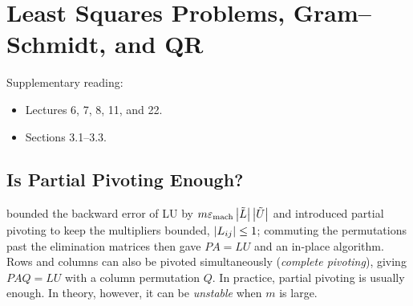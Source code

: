 \chapter{Least Squares Problems, Gram--Schmidt, and QR}
\label{ch:ls}

Supplementary reading:
\begin{itemize}
  \item \cite{TB} Lectures 6, 7, 8, 11, and 22.
  \item \cite{Demmel} Sections 3.1--3.3.
\end{itemize}

\section{Is Partial Pivoting Enough?}

 bounded the backward error of LU by $m\varepsilon_{\mathrm{mach}}\left\lvert \tilde{L} \right\rvert\left\lvert \tilde{U} \right\rvert$ and introduced partial pivoting to keep the multipliers bounded, $\left\lvert L_{ij} \right\rvert \le 1$; commuting the permutations past the elimination matrices then gave $PA = LU$ and an in-place algorithm. Rows and columns can also be pivoted simultaneously (\emph{complete pivoting}), giving $PAQ = LU$ with a column permutation $Q$. In practice, partial pivoting is usually enough. In theory, however, it can be \emph{unstable} when $m$ is large.

